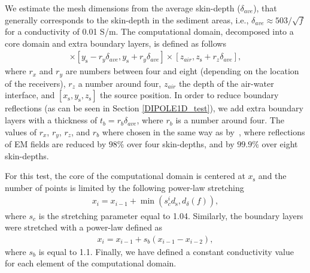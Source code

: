 \documentclass[review]{elsarticle}
\begin{document}
We estimate the mesh dimensions from the average skin-depth ($\delta_{ave}$), that generally corresponds to the skin-depth in the sediment areas, i.e., $\delta_{ave} \approx 503 / \sqrt{f}$ for a conductivity of 0.01 S/m. The computational domain, decomposed into a core domain and extra boundary layers, is defined as follows
\begin{align}
[x_{\text{s}}-r_{x}\delta_{ave}, x_{\text{s}} + r_{x}\delta_{ave}] \times [y_{\text{s}}-r_{y}\delta_{ave}, y_{\text{s}} + r_{y}\delta_{ave}] \times [z_{air}, z_{\text{s}} + r_{z}\delta_{ave}],
\label{eq:core_computational_domain}
\end{align}
where $r_{x}$ and $r_{y}$ are numbers between four and eight (depending on the location of the receivers), $r_{z}$ a number around four, $z_{air}$ the depth of the air-water interface, and $[x_{\text{s}},y_{\text{s}},z_{\text{s}}]$ the source position. In order to reduce boundary reflections (as can be seen in Section \ref{DIPOLE1D_test}), we add extra boundary layers with a thickness of $t_{b} = r_{b}\delta_{ave}$, where $r_{b}$ is a number around four. The values of $r_{x}$, $r_{y}$, 
$r_{z}$, and $r_{b}$ where chosen in the same way as by~\citet{Plessix2007}, where reflections of EM fields are reduced by $98\%$ over four skin-depths, and by $99.9\%$ over eight skin-depths.

For this test, the core of the computational domain is centered at $x_{\text{s}}$ and the number of points is limited by the following power-law stretching
\begin{align}
x_{i} = x_{i-1} + \min ( s_{c}^{i} d_{\text{s}}, d_{\delta}(f) ),
\label{eq:power_law_stretching_core}
\end{align}
where $s_{c}$ is the stretching parameter equal to 1.04. Similarly, the boundary layers were stretched with a power-law defined as
\begin{align}
x_{i} = x_{i-1} + s_{b}(x_{i-1} - x_{i-2}),
\label{eq:power_law_stretching_boundaries}
\end{align}
where $s_{b}$ is equal to 1.1. Finally, we have defined a constant conductivity value for each element of the computational domain.
\end{document}
